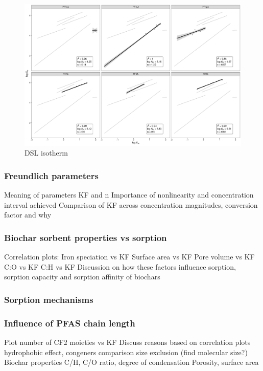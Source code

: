 \begin{figure}
    \centering
    \includegraphics[width=\textwidth]{R/figs/DSL_facet_isotherm.pdf}
    \caption{DSL isotherm}
    \label{DSL_isotherm}
\end{figure}

\subsubsection{Freundlich parameters}
Meaning of parameters KF and n
Importance of nonlinearity and concentration interval achieved 
Comparison of KF across concentration magnitudes, conversion factor and why

\subsubsection{Biochar sorbent properties vs sorption}
Correlation plots:
    Iron speciation vs KF
    Surface area vs KF 
    Pore volume vs KF 
    C:O vs KF 
    C:H vs KF  
Discussion on how these factors influence sorption, sorption capacity and sorption affinity of biochars

\subsubsection{Sorption mechanisms}

\subsubsection{Influence of PFAS chain length}
Plot number of CF2 moieties vs KF 
Discuss reasons based on correlation plots
    hydrophobic effect, congeners comparison
    size exclusion (find molecular size?)
    Biochar properties
        C/H, C/O ratio, degree of condensation
        Porosity, surface area

